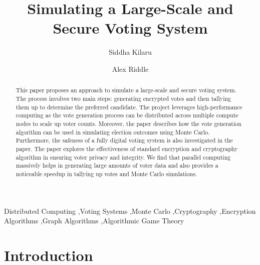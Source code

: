 \documentclass[final,5p,times,twocolumn,authoryear, 10pt]{elsarticle}
\begin{document}
\begin{frontmatter}

\title{Simulating a Large-Scale and Secure Voting System}


\author{Siddha Kilaru}
\author{Alex Riddle}

\address{Rensselaer Polytechnic Institute, Troy, NY}


\begin{abstract}
This paper proposes an approach to simulate a large-scale and secure voting
system. The process involves two main steps: generating encrypted votes and
then tallying them up to determine the preferred candidate. The project
leverages high-performance computing as the vote generation process can be
distributed across multiple compute nodes to scale up voter counts. Moreover,
the paper describes how the vote generation algorithm can be used in simulating
election outcomes using Monte Carlo. Furthermore, the safeness of a fully
digital voting system is also investigated in the paper. The paper explores the
effectiveness of standard encryption and cryptography algorithm in ensuring
voter privacy and integrity. We find that parallel computing massively helps in
generating large amounts of voter data and also provides a noticeable speedup
in tallying up votes and Monte Carlo simulations.

\end{abstract}

\begin{keyword}
Distributed Computing \sep Voting Systems \sep Monte Carlo \sep Cryptography
\sep Encryption Algorithms \sep Graph Algorithms \sep Algorithmic Game Theory



\end{keyword}


\end{frontmatter}
{ \hypersetup{hidelinks} \tableofcontents}


\section{Introduction}
\label{introduction}
\end{document}
